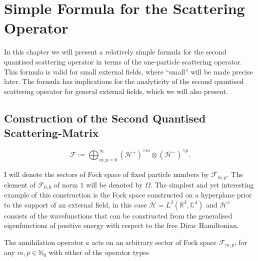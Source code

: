 \documentclass[b5paper,draft,openbib,12pt]{memoir}
\begin{document}
\section{Simple Formula for the Scattering Operator}
In this chapter we will present a relatively simple 
formula for the second quantised scattering operator 
in terms of the one-particle scattering operator. 
This formula is valid for small external fields, where 
``small'' will be made precise later. The formula has 
implications for the analyticity of the second quantised 
scattering operator for general external fields, which 
we will also present.

\subsection{Construction of the Second Quantised Scattering-Matrix}\label{sec:second quant}


\begin{equation}
\mathcal{F}:=\bigoplus_{m,p=0}^\infty \left(\mathcal{H}^+ \right)^{\wedge m} \otimes \left(\overline{\mathcal{H}^- }\right)^{\wedge p}.
\end{equation}

I will denote the sectors of Fock space of fixed particle
numbers by \(\mathcal{F}_{m,p}\). The element of
\(\mathcal{F}_{0,0}\) of norm \(1\) will be denoted by \(\Omega\).
The simplest and yet interesting example of this construction is
the Fock space constructed on a hyperplane prior to the support of an external field,
in this case \(\mathcal{H}=L^2(\mathbb{R}^3,\mathbb{C}^4)\) and \(\mathcal{H}^+\)
consists of the wavefunctions that can be constructed from the generalised eigenfunctions
of positive energy with respect to the free Dirac Hamiltonian.

The
annihilation operator \(a\) acts on an arbitrary sector of Fock space
\(\mathcal{F}_{m,p}\), for any \(m,p\in\mathbb{N}_0\) with either of the operator types
\end{document}

